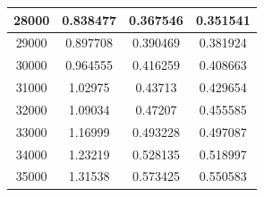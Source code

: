 \begin{center}
\begin{tabular}{| c | c | c | c |}
28000 & 0.838477 & 0.367546 & 0.351541 \\ \hline
29000 & 0.897708 & 0.390469 & 0.381924 \\ \hline
30000 & 0.964555 & 0.416259 & 0.408663 \\ \hline
31000 & 1.02975 & 0.43713 & 0.429654 \\ \hline
32000 & 1.09034 & 0.47207 & 0.455585 \\ \hline
33000 & 1.16999 & 0.493228 & 0.497087 \\ \hline
34000 & 1.23219 & 0.528135 & 0.518997 \\ \hline
35000 & 1.31538 & 0.573425 & 0.550583 \\ \hline
\hline
\end{tabular}
\end{center}
